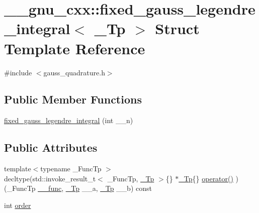 \hypertarget{struct____gnu__cxx_1_1fixed__gauss__legendre__integral}{}\section{\+\_\+\+\_\+gnu\+\_\+cxx\+:\+:fixed\+\_\+gauss\+\_\+legendre\+\_\+integral$<$ \+\_\+\+Tp $>$ Struct Template Reference}
\label{struct____gnu__cxx_1_1fixed__gauss__legendre__integral}


{\ttfamily \#include $<$gauss\+\_\+quadrature.\+h$>$}

\subsection*{Public Member Functions}
\begin{DoxyCompactItemize}
\item 
\hyperlink{struct____gnu__cxx_1_1fixed__gauss__legendre__integral_ad5210c037dcd806afb26e1888ce9676f}{fixed\+\_\+gauss\+\_\+legendre\+\_\+integral} (int \+\_\+\+\_\+n)
\end{DoxyCompactItemize}
\subsection*{Public Attributes}
\begin{DoxyCompactItemize}
\item 
{\footnotesize template$<$typename \+\_\+\+Func\+Tp $>$ }\\decltype(std\+::invoke\+\_\+result\+\_\+t$<$ \+\_\+\+Func\+Tp, \hyperlink{namespace____gnu__cxx_a3b19a9c800ca194374ef9172290f7d79}{\+\_\+\+Tp} $>$\{\} $\ast$\hyperlink{namespace____gnu__cxx_a3b19a9c800ca194374ef9172290f7d79}{\+\_\+\+Tp}\{\} \hyperlink{struct____gnu__cxx_1_1fixed__gauss__legendre__integral_aa6a0f40e1c8dba2864c88401fea3067d}{operator()} )(\+\_\+\+Func\+Tp \hyperlink{namespace____gnu__cxx_af2b2f0c7a2ae72b922b1afefae5a65b2}{\+\_\+\+\_\+func}, \hyperlink{namespace____gnu__cxx_a3b19a9c800ca194374ef9172290f7d79}{\+\_\+\+Tp} \+\_\+\+\_\+a, \hyperlink{namespace____gnu__cxx_a3b19a9c800ca194374ef9172290f7d79}{\+\_\+\+Tp} \+\_\+\+\_\+b) const
\item 
int \hyperlink{struct____gnu__cxx_1_1fixed__gauss__legendre__integral_a51724253e7545ed73de4be77aabf951a}{order}
\end{DoxyCompactItemize}



